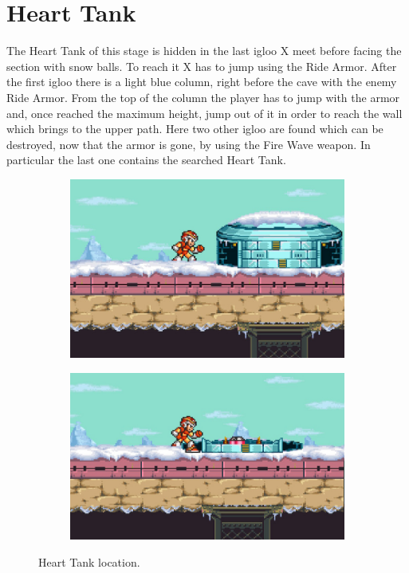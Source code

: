 \section{Heart Tank}\label{Penguin:heart_tank}
The Heart Tank of this stage is hidden in the last igloo X meet before facing the section with snow balls. To reach it X has to jump using the Ride Armor. After the first igloo there is a light blue column, right before the cave with the enemy Ride Armor. From the top of the column the player has to jump with the armor and, once reached the maximum height, jump out of it in order to reach the wall which brings to the upper path. Here two other igloo are found which can be destroyed, now that the armor is gone, by using the Fire Wave weapon. In particular the last one contains the searched Heart Tank.
\begin{figure}[htp]
	\centering
	\begin{subfigure}{0.375\linewidth}
		\centering
		\includegraphics[width=\textwidth]{figures/X1/Chill_penguin/Chill_heart_1.jpg}	
		\caption{}
	\end{subfigure}
	\begin{subfigure}{0.4\linewidth}
		\centering
		\includegraphics[width=\textwidth]{figures/X1/Chill_penguin/Chill_heart_2.jpg}	
		\caption{}
	\end{subfigure}
	\caption{Heart Tank location.}
\end{figure}

